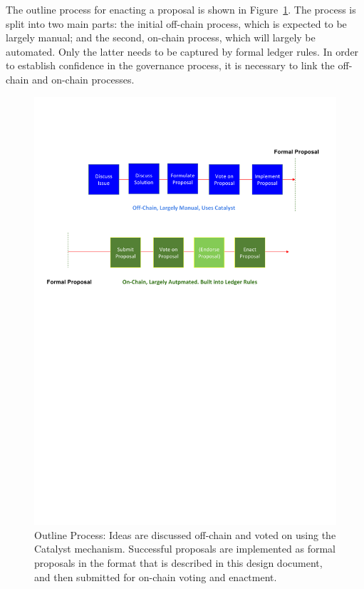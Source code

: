 The outline process for enacting a proposal is shown in Figure~\ref{fig:workflows}.   The process is split into two main parts: the initial off-chain process, which is expected to be largely manual; and the second, on-chain process, which will largely be
automated.  Only the latter needs to be captured by formal ledger rules.  In order to establish confidence in the governance process,
it is necessary to link the off-chain and on-chain processes.

\begin{figure}
  \begin{center}
  \includegraphics[trim=0 450 0 100,clip,width=\textwidth]{StoryBoard2}
  \end{center}
  \caption{Outline Process: Ideas are discussed off-chain and voted on using the Catalyst mechanism.  Successful proposals are implemented as formal proposals in the format that is described in this design document, and then submitted for on-chain voting and enactment.}
\label{fig:workflows}
\end{figure}

